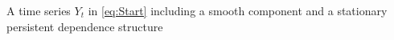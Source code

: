 \documentclass[12pt]{article}
\begin{document}
%
A time series \(Y_t\) in \eqref{eq:Start} including a smooth component and a stationary persistent dependence structure 
\end{document}
